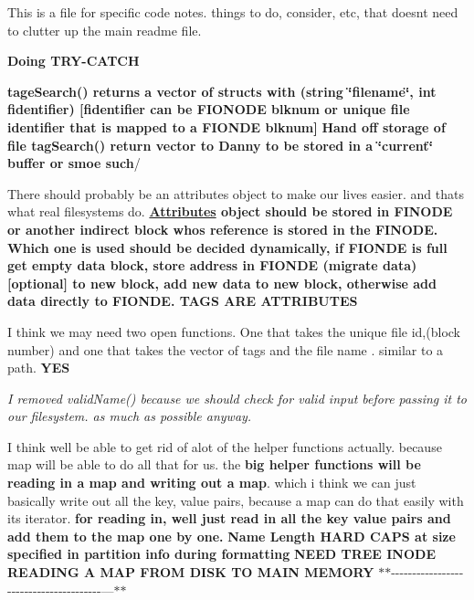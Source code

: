This is a file for specific code notes. things to do, consider, etc, that doesn\textquotesingle{}t need to clutter up the main readme file.

{\bfseries Doing T\+R\+Y-\/\+C\+A\+T\+CH}

{\bfseries tage\+Search() returns a vector of structs with (string \char`\"{}filename\char`\"{}, int fidentifier) \mbox{[}fidentifier can be F\+I\+O\+N\+O\+DE blknum or unique file identifier that is mapped to a F\+I\+O\+N\+DE blknum\mbox{]}} {\bfseries Hand off storage of file tag\+Search() return vector to Danny to be stored in a \char`\"{}current\char`\"{} buffer or smoe such}/

There should probably be an attributes object to make our lives easier. and thats what real filesystems do. {\bfseries \hyperlink{classAttributes}{Attributes} object should be stored in F\+I\+N\+O\+DE or another indirect block who\textquotesingle{}s reference is stored in the F\+I\+N\+O\+DE. Which one is used should be decided dynamically, if F\+I\+O\+N\+DE is full get empty data block, store address in F\+I\+O\+N\+DE (migrate data)\mbox{[}optional\mbox{]} to new block, add new data to new block, otherwise add data directly to F\+I\+O\+N\+DE. T\+A\+GS A\+RE A\+T\+T\+R\+I\+B\+U\+T\+ES}

I think we may need two open functions. One that takes the unique file id,(block number) and one that takes the vector of tags and the file name . similar to a path. {\bfseries Y\+ES}

{\itshape I removed valid\+Name() because we should check for valid input before passing it to our filesystem. as much as possible anyway.}

I think we\textquotesingle{}ll be able to get rid of alot of the helper functions actually. because map will be able to do all that for us. the {\bfseries big helper functions will be reading in a map and writing out a map}. which i think we can just basically write out all the key, value pairs, because a map can do that easily with its iterator. {\bfseries for reading in, we\textquotesingle{}ll just read in all the key value pairs and add them to the map one by one.} {\bfseries Name Length H\+A\+RD C\+A\+PS at size specified in partition info during formatting} {\bfseries N\+E\+ED T\+R\+EE I\+N\+O\+DE} {\bfseries R\+E\+A\+D\+I\+NG A M\+AP F\+R\+OM D\+I\+SK TO M\+A\+IN M\+E\+M\+O\+RY} $\ast$$\ast$-\/-\/-\/-\/-\/-\/-\/-\/-\/-\/-\/-\/-\/-\/-\/-\/-\/-\/-\/-\/-\/-\/-\/-\/-\/-\/-\/-\/-\/-\/-\/-\/-\/-\/-\/-\/-\/-\/-\/---$\ast$$\ast$

